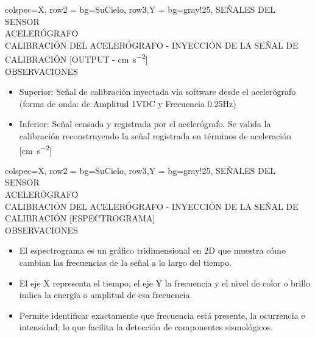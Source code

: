 \begin{tblr}{
        colspec={X},
        row{2} = {bg=SuCielo},
        row{3,Y} = {bg=gray!25},
    } %
    SEÑALES DEL SENSOR \\
    ACELERÓGRAFO \MakeUppercase{} \\
    CALIBRACIÓN DEL ACELERÓGRAFO - INYECCIÓN DE LA SEÑAL DE CALIBRACIÓN [OUTPUT - \unit{\centi\meter\per\square\second}] \\
    OBSERVACIONES \\
    \begin{itemize}
        \item Superior: Señal de calibración inyectada vía software desde el acelerógrafo (forma de onda:  de Amplitud 1VDC y Frecuencia 0.25Hz)
        \item Inferior: Señal censada y registrada por el acelerógrafo. Se valida la calibración reconstruyendo la señal registrada en términos de aceleración [\unit{\centi\meter\per\square\second}]
    \end{itemize}
\end{tblr}
% 
\newpage
\begin{tblr}{
        colspec={X},
        row{2} = {bg=SuCielo},
        row{3,Y} = {bg=gray!25},
    } %
    SEÑALES DEL SENSOR \\
    ACELERÓGRAFO \MakeUppercase{} \\
    CALIBRACIÓN DEL ACELERÓGRAFO - INYECCIÓN DE LA SEÑAL DE CALIBRACIÓN [ESPECTROGRAMA] \\
    OBSERVACIONES \\
    \begin{itemize}
        \item El espectrograma es un gráfico tridimensional en 2D que muestra cómo cambian las frecuencias de la señal a lo largo del tiempo.
        \item El eje X representa el tiempo, el eje Y la frecuencia y el nivel de color o brillo indica la energía o amplitud de esa frecuencia.
        \item Permite identificar exactamente que frecuencia está presente, la ocurrencia e intensidad; lo que facilita la detección de componentes sismológicos.
    \end{itemize}
\end{tblr}
% 
